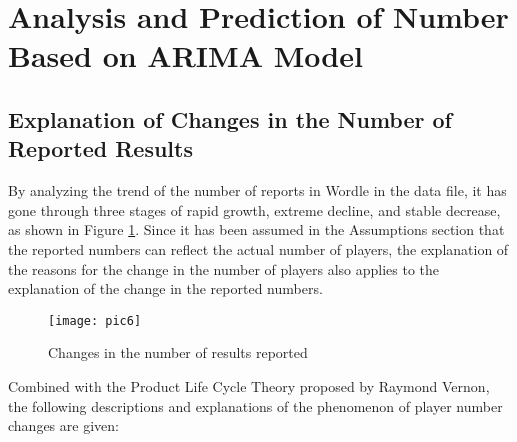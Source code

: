 \documentclass[12pt]{article}  %
\begin{document}
\section{Analysis and Prediction of Number Based on ARIMA Model}
\subsection{Explanation of Changes in the Number of Reported Results}
By analyzing the trend of the number of reports in Wordle in the data file, it has gone through three stages of rapid growth, extreme decline, and stable decrease, as shown in Figure \ref{pic6}. Since it has been assumed in the Assumptions section that the reported numbers can reflect the actual number of players, the explanation of the reasons for the change in the number of players also applies to the explanation of the change in the reported numbers.
\begin{figure}[htbp]  %
	\centering  %
	\texttt{[image: pic6]} %
	\caption{Changes in the number of results reported}  
	\label{pic6}
\end{figure}


Combined with the Product Life Cycle Theory proposed by Raymond Vernon\cite{2}, the following descriptions and explanations of the phenomenon of player number changes are given:
\end{document}
